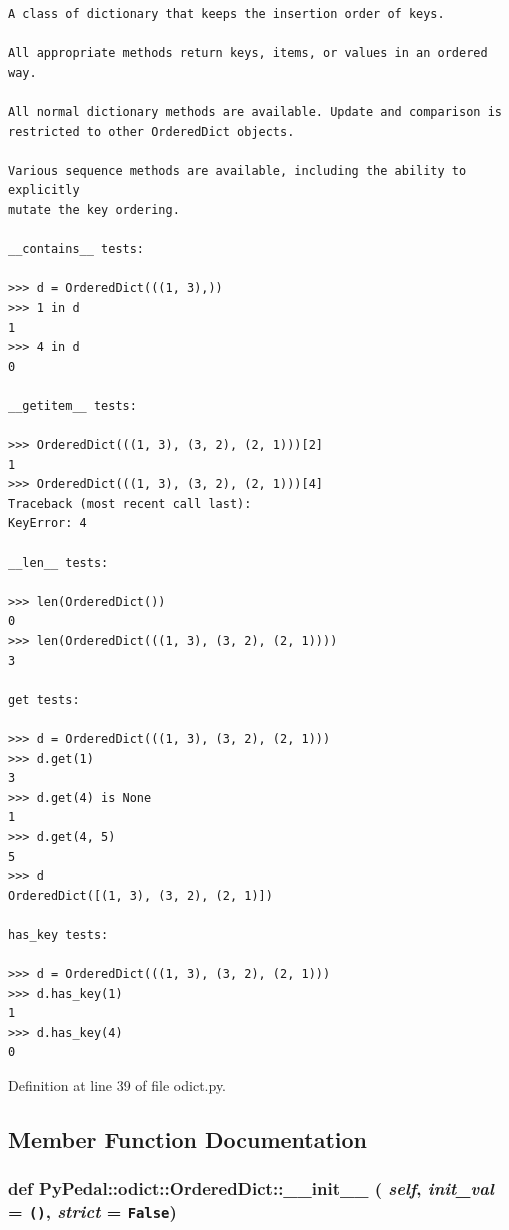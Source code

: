 \footnotesize\begin{verbatim}
A class of dictionary that keeps the insertion order of keys.

All appropriate methods return keys, items, or values in an ordered way.

All normal dictionary methods are available. Update and comparison is
restricted to other OrderedDict objects.

Various sequence methods are available, including the ability to explicitly
mutate the key ordering.

__contains__ tests:

>>> d = OrderedDict(((1, 3),))
>>> 1 in d
1
>>> 4 in d
0

__getitem__ tests:

>>> OrderedDict(((1, 3), (3, 2), (2, 1)))[2]
1
>>> OrderedDict(((1, 3), (3, 2), (2, 1)))[4]
Traceback (most recent call last):
KeyError: 4

__len__ tests:

>>> len(OrderedDict())
0
>>> len(OrderedDict(((1, 3), (3, 2), (2, 1))))
3

get tests:

>>> d = OrderedDict(((1, 3), (3, 2), (2, 1)))
>>> d.get(1)
3
>>> d.get(4) is None
1
>>> d.get(4, 5)
5
>>> d
OrderedDict([(1, 3), (3, 2), (2, 1)])

has_key tests:

>>> d = OrderedDict(((1, 3), (3, 2), (2, 1)))
>>> d.has_key(1)
1
>>> d.has_key(4)
0
\end{verbatim}
\normalsize
 

Definition at line 39 of file odict.py.

\subsection{Member Function Documentation}
\hypertarget{classPyPedal_1_1odict_1_1OrderedDict_2819b83b7012be60ef9936b6716b9f7c}{
\subsubsection{\setlength{\rightskip}{0pt plus 5cm}def PyPedal::odict::OrderedDict::\_\-\_\-init\_\-\_\- ( {\em self}, \/   {\em init\_\-val} = {\tt ()}, \/   {\em strict} = {\tt False})}}
\label{classPyPedal_1_1odict_1_1OrderedDict_2819b83b7012be60ef9936b6716b9f7c}




